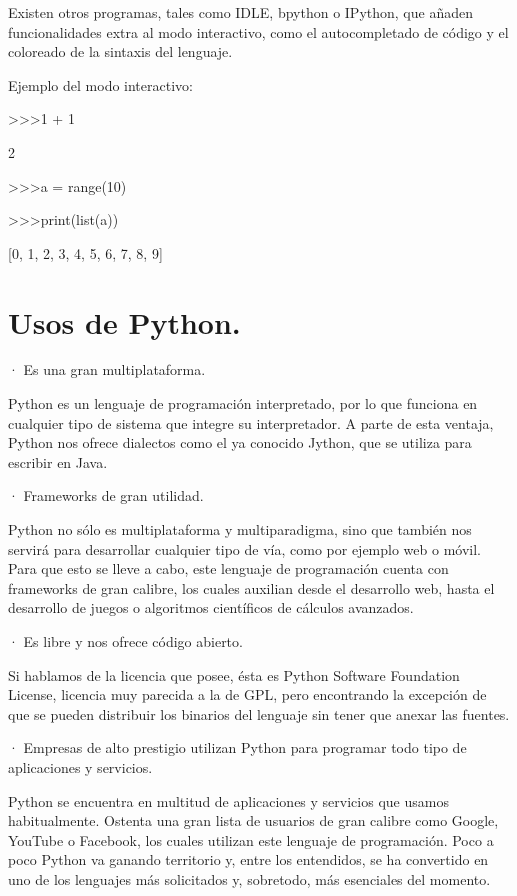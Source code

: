 Existen otros programas, tales como IDLE, bpython o IPython, que añaden funcionalidades extra al modo interactivo, como el autocompletado de código y el coloreado de la sintaxis del lenguaje.

Ejemplo del modo interactivo:

\textgreater\textgreater\textgreater 1 + 1

2

\textgreater\textgreater\textgreater a = range(10)

\textgreater\textgreater\textgreater print(list(a))

[0, 1, 2, 3, 4, 5, 6, 7, 8, 9]

\cite{Wikipedia1WebSite}



\section{Usos de Python.}

· Es una gran multiplataforma.

Python es un lenguaje de programación interpretado, por lo que funciona en cualquier tipo de sistema que integre su interpretador.  A parte de esta ventaja, Python nos ofrece dialectos como el ya conocido Jython, que se utiliza para escribir en Java.
 
· Frameworks de gran utilidad.

Python no sólo es multiplataforma y multiparadigma, sino que también nos servirá para desarrollar cualquier tipo de vía, como por ejemplo web o móvil. Para que esto se lleve a cabo, este lenguaje de programación cuenta con frameworks de gran calibre, los cuales auxilian desde el desarrollo web, hasta el desarrollo de juegos o algoritmos científicos de cálculos avanzados.
 
· Es libre y nos ofrece código abierto.

Si hablamos de la licencia que posee, ésta es Python Software Foundation License, licencia muy parecida a la de GPL, pero encontrando la excepción de que se pueden distribuir los binarios del lenguaje sin tener que anexar las fuentes.
 
· Empresas de alto prestigio utilizan Python para programar todo tipo de aplicaciones y servicios.

Python se encuentra en multitud de aplicaciones y servicios que usamos habitualmente. Ostenta una gran lista de usuarios de gran calibre como Google, YouTube o Facebook, los cuales utilizan este lenguaje de programación. Poco a poco Python va ganando territorio y, entre los entendidos, se ha convertido en uno de los lenguajes más solicitados y, sobretodo, más esenciales del momento.

